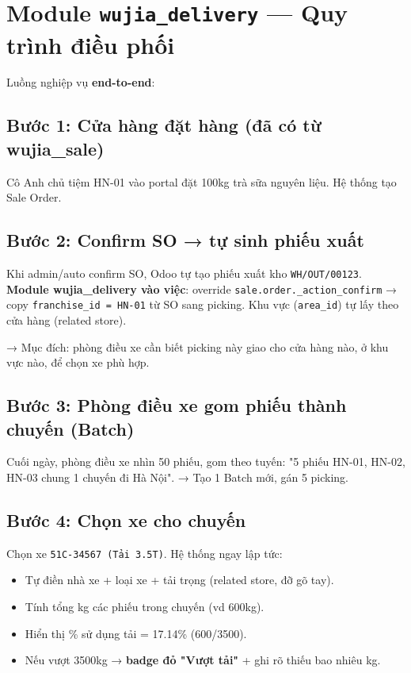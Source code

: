 \section{Module \texttt{wujia\_delivery} --- Quy trình điều phối}

Luồng nghiệp vụ \textbf{end-to-end}:

\subsection{Bước 1: Cửa hàng đặt hàng (đã có từ wujia\_sale)}

Cô Anh chủ tiệm HN-01 vào portal đặt 100kg trà sữa nguyên liệu. Hệ thống tạo Sale Order.

\subsection{Bước 2: Confirm SO → tự sinh phiếu xuất}

Khi admin/auto confirm SO, Odoo tự tạo phiếu xuất kho \texttt{WH/OUT/00123}. \textbf{Module wujia\_delivery vào việc}: override \texttt{sale.order.\_action\_confirm} → copy \texttt{franchise\_id = HN-01} từ SO sang picking. Khu vực (\texttt{area\_id}) tự lấy theo cửa hàng (related store).

→ Mục đích: phòng điều xe cần biết picking này giao cho cửa hàng nào, ở khu vực nào, để chọn xe phù hợp.

\subsection{Bước 3: Phòng điều xe gom phiếu thành chuyến (Batch)}

Cuối ngày, phòng điều xe nhìn 50 phiếu, gom theo tuyến: "5 phiếu HN-01, HN-02, HN-03 chung 1 chuyến đi Hà Nội". → Tạo 1 Batch mới, gán 5 picking.

\subsection{Bước 4: Chọn xe cho chuyến}

Chọn xe \texttt{51C-34567 (Tải 3.5T)}. Hệ thống ngay lập tức:

\begin{itemize}
    \item Tự điền nhà xe + loại xe + tải trọng (related store, đỡ gõ tay).
    \item Tính tổng kg các phiếu trong chuyến (vd 600kg).
    \item Hiển thị \% sử dụng tải = 17.14\% (600/3500).
    \item Nếu vượt 3500kg → \textbf{badge đỏ "Vượt tải"} + ghi rõ thiếu bao nhiêu kg.
\end{itemize}

